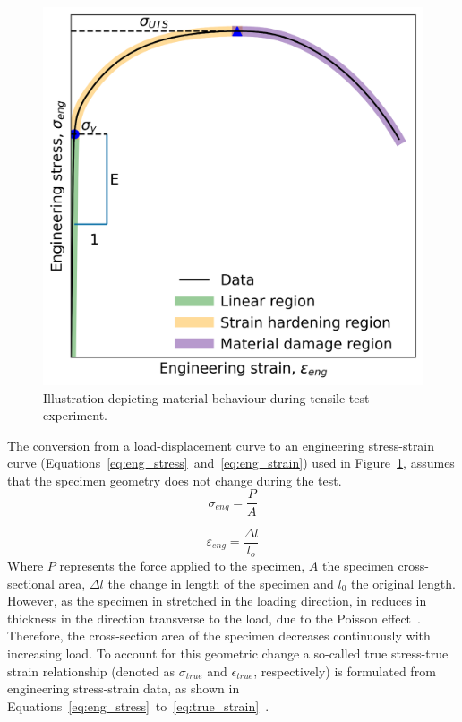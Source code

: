 \documentclass[preprint, review, 12pt]{elsarticle}
\begin{document}
	\begin{figure}[!htbp]
		\centering
		\includegraphics[width=\linewidth, height=0.4\textheight, keepaspectratio]{DIAGRAM_ENG_SS}
		\caption{Illustration depicting material behaviour during tensile test experiment.}
		\label{fig:eng_ss}
	\end{figure}
	The conversion from a load-displacement curve to an engineering stress-strain curve (Equations~\ref{eq:eng_stress}~and~\ref{eq:eng_strain}) used in Figure~\ref{fig:eng_ss}, assumes that the specimen geometry does not change during the test.
		\begin{equation}
		\sigma_{eng} = \frac{P}{A}
		\label{eq:eng_stress}
	\end{equation}

	\begin{equation}
		\varepsilon_{eng} = \frac{\Delta l}{l_o}
		\label{eq:eng_strain}
	\end{equation}
	Where $P$ represents the force applied to the specimen, $A$ the specimen cross-sectional area, $\Delta l$ the change in length of the specimen and $l_0$ the original length.
	However, as the specimen in stretched in the loading direction, in reduces in thickness in the direction transverse to the load, due to the Poisson effect~\cite{YOUNG2001}.
	Therefore, the cross-section area of the specimen decreases continuously with increasing load.
	To account for this geometric change a so-called true stress-true strain relationship (denoted as $\sigma_{true}$ and $\epsilon_{true}$, respectively) is formulated from engineering stress-strain data, as shown in Equations~\ref{eq:eng_stress}~to~\ref{eq:true_strain}~\cite{YOUNG2001}.
\end{document}
